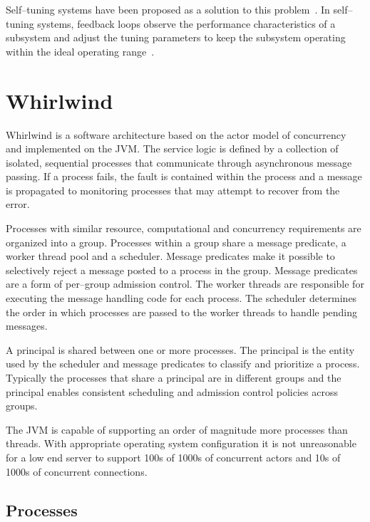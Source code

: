 \documentclass[conference]{IEEEtran}
\begin{document}
Self--tuning systems have been proposed as a solution to this problem~\cite{Kephart03AutonomicVision}. In self--tuning systems, feedback loops observe the performance characteristics of a subsystem and adjust the tuning parameters to keep the subsystem operating within the ideal operating range~\cite{welsh03Adaptive,Heiss:91:AdaptiveLoadControl}.

\section{Whirlwind}

Whirlwind is a software architecture based on the actor model of concurrency and implemented on the JVM. The service logic is defined by a collection of isolated, sequential processes that communicate through asynchronous message passing. If a process fails, the fault is contained within the process and a message is propagated to monitoring processes that may attempt to recover from the error.

Processes with similar resource, computational and concurrency requirements are organized into a group. Processes within a group share a message predicate, a worker thread pool and a scheduler. Message predicates make it possible to selectively reject a message posted to a process in the group. Message predicates are a form of per--group admission control. The worker threads are responsible for executing the message handling code for each process. The scheduler determines the order in which processes are passed to the worker threads to handle pending messages.

A principal is shared between one or more processes. The principal is the entity used by the scheduler and message predicates to classify and prioritize a process. Typically the processes that share a principal are in different groups and the principal enables consistent scheduling and admission control policies across groups.


The JVM is capable of supporting an order of magnitude more processes than threads. With appropriate operating system configuration it is not unreasonable for a low end server to support 100s of 1000s of concurrent actors and 10s of 1000s of concurrent connections.

\subsection{Processes}
\label{section:Processes}
\end{document}
